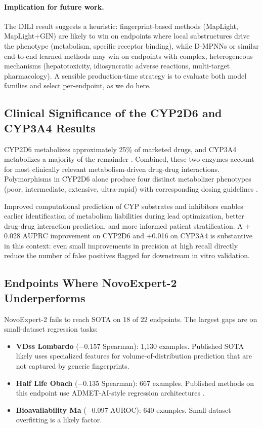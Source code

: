 \documentclass[11pt]{article}
\begin{document}
\paragraph{Implication for future work.} The DILI result suggests a heuristic: fingerprint-based methods (MapLight, MapLight+GIN) are likely to win on endpoints where local substructures drive the phenotype (metabolism, specific receptor binding), while D-MPNNs or similar end-to-end learned methods may win on endpoints with complex, heterogeneous mechanisms (hepatotoxicity, idiosyncratic adverse reactions, multi-target pharmacology). A sensible production-time strategy is to evaluate both model families and select per-endpoint, as we do here.

\subsection{Clinical Significance of the CYP2D6 and CYP3A4 Results}

CYP2D6 metabolizes approximately 25\% of marketed drugs, and CYP3A4 metabolizes a majority of the remainder \citep{zanger2013cytochrome, guengerich2008cytochrome}. Combined, these two enzymes account for most clinically relevant metabolism-driven drug-drug interactions. Polymorphisms in CYP2D6 alone produce four distinct metabolizer phenotypes (poor, intermediate, extensive, ultra-rapid) with corresponding dosing guidelines \citep{crews2014clinical, gaedigk2017pharmacogene}.

Improved computational prediction of CYP substrates and inhibitors enables earlier identification of metabolism liabilities during lead optimization, better drug-drug interaction prediction, and more informed patient stratification. A $+$0.028 AUPRC improvement on CYP2D6 and $+$0.016 on CYP3A4 is substantive in this context: even small improvements in precision at high recall directly reduce the number of false positives flagged for downstream in vitro validation.

\subsection{Endpoints Where NovoExpert-2 Underperforms}

NovoExpert-2 fails to reach SOTA on 18 of 22 endpoints. The largest gaps are on small-dataset regression tasks:

\begin{itemize}
    \item \textbf{VDss Lombardo} ($-$0.157 Spearman): 1{,}130 examples. Published SOTA likely uses specialized features for volume-of-distribution prediction that are not captured by generic fingerprints.
    \item \textbf{Half Life Obach} ($-$0.135 Spearman): 667 examples. Published methods on this endpoint use ADMET-AI-style regression architectures \citep{swanson2023admetai}.
    \item \textbf{Bioavailability Ma} ($-$0.097 AUROC): 640 examples. Small-dataset overfitting is a likely factor.
\end{itemize}
\end{document}
